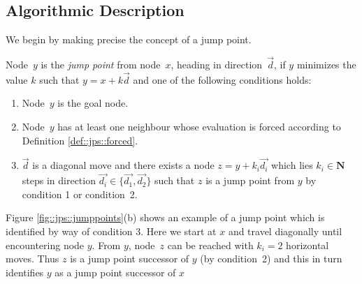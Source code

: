 \subsection{Algorithmic Description}



We begin by making precise the concept of a jump point.  

\begin{definition}
\label{def::jps::jump}
Node~$y$ is the \emph{jump point} from node~$x$, heading in direction~$\vec{d}$,
if $y$ minimizes the value $k$ such that $y = x + k \vec{d}$ and one of the
following conditions holds:
\begin{enumerate}
\item{Node~$y$ is the goal node.}
\item{Node~$y$ has at least one neighbour whose evaluation is forced according 
to Definition \ref{def::jps::forced}.}
\item{$\vec{d}$ is a diagonal move and there exists a node $z = y +
k_i\vec{d_{i}}$ which lies $k_i \in \mathbf{N}$ steps in direction $\vec{d_i} \in
\{\vec{d_1},\vec{d_2}\}$ such that $z$ is a jump point from $y$ by condition 1 or condition~2.}
\end{enumerate}
\end{definition}

Figure \ref{fig::jps::jumppoints}(b) shows an example of a jump point which is
identified by way of condition 3.
Here we start at $x$ and travel diagonally until encountering node $y$. 
From $y$, node~$z$ can be reached with $k_i = 2$ horizontal moves.
Thus $z$ is a jump point successor of $y$ (by condition~2) and this in turn
identifies $y$ as a jump point successor of $x$ 



